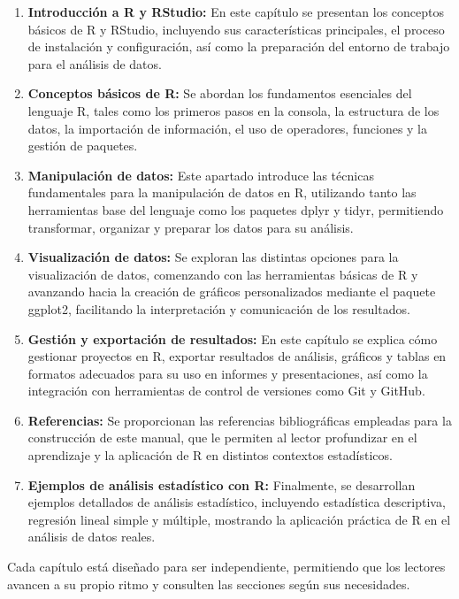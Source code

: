 \documentclass[
  spanish,
  a4paper,
  DIV=11,
  numbers=noendperiod,
  onepage,
  openany]{scrreprt}
\begin{document}
\begin{enumerate}
\def\labelenumi{\arabic{enumi}.}
\item
  \textbf{Introducción a R y RStudio:} En este capítulo se presentan los
  conceptos básicos de R y RStudio, incluyendo sus características
  principales, el proceso de instalación y configuración, así como la
  preparación del entorno de trabajo para el análisis de datos.
\item
  \textbf{Conceptos básicos de R:} Se abordan los fundamentos esenciales
  del lenguaje R, tales como los primeros pasos en la consola, la
  estructura de los datos, la importación de información, el uso de
  operadores, funciones y la gestión de paquetes.
\item
  \textbf{Manipulación de datos:} Este apartado introduce las técnicas
  fundamentales para la manipulación de datos en R, utilizando tanto las
  herramientas base del lenguaje como los paquetes dplyr y tidyr,
  permitiendo transformar, organizar y preparar los datos para su
  análisis.
\item
  \textbf{Visualización de datos:} Se exploran las distintas opciones
  para la visualización de datos, comenzando con las herramientas
  básicas de R y avanzando hacia la creación de gráficos personalizados
  mediante el paquete ggplot2, facilitando la interpretación y
  comunicación de los resultados.
\item
  \textbf{Gestión y exportación de resultados:} En este capítulo se
  explica cómo gestionar proyectos en R, exportar resultados de
  análisis, gráficos y tablas en formatos adecuados para su uso en
  informes y presentaciones, así como la integración con herramientas de
  control de versiones como Git y GitHub.
\item
  \textbf{Referencias:} Se proporcionan las referencias bibliográficas
  empleadas para la construcción de este manual, que le permiten al
  lector profundizar en el aprendizaje y la aplicación de R en distintos
  contextos estadísticos.
\item
  \textbf{Ejemplos de análisis estadístico con R:} Finalmente, se
  desarrollan ejemplos detallados de análisis estadístico, incluyendo
  estadística descriptiva, regresión lineal simple y múltiple, mostrando
  la aplicación práctica de R en el análisis de datos reales.
\end{enumerate}

Cada capítulo está diseñado para ser independiente, permitiendo que los
lectores avancen a su propio ritmo y consulten las secciones según sus
necesidades.
\end{document}
